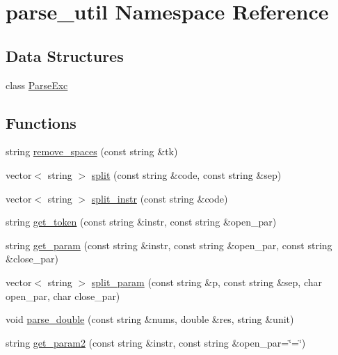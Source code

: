 \hypertarget{namespaceparse__util}{}\section{parse\+\_\+util Namespace Reference}
\label{namespaceparse__util}
\subsection*{Data Structures}
\begin{DoxyCompactItemize}
\item 
class \hyperlink{classparse__util_1_1ParseExc}{Parse\+Exc}
\end{DoxyCompactItemize}
\subsection*{Functions}
\begin{DoxyCompactItemize}
\item 
string \hyperlink{namespaceparse__util_adda823e5ea0e371029fd8d7d9aaaf4d9}{remove\+\_\+spaces} (const string \&tk)
\item 
vector$<$ string $>$ \hyperlink{namespaceparse__util_abed338a93fcf282d1ac304cd901aba6f}{split} (const string \&code, const string \&sep)
\item 
vector$<$ string $>$ \hyperlink{namespaceparse__util_a14526fd1fe35767507f2c20ac147ade3}{split\+\_\+instr} (const string \&code)
\item 
string \hyperlink{namespaceparse__util_a6ad8105b273c8cf887c3f3af52a18913}{get\+\_\+token} (const string \&instr, const string \&open\+\_\+par)
\item 
string \hyperlink{namespaceparse__util_ad1d53324b50452d7a1e53fa9b9f37834}{get\+\_\+param} (const string \&instr, const string \&open\+\_\+par, const string \&close\+\_\+par)
\item 
vector$<$ string $>$ \hyperlink{namespaceparse__util_a5f92a28671f0d399f0dc639c5b72e709}{split\+\_\+param} (const string \&p, const string \&sep, char open\+\_\+par, char close\+\_\+par)
\item 
void \hyperlink{namespaceparse__util_a498f01b8de3af4281754eb7bb9246fba}{parse\+\_\+double} (const string \&nums, double \&res, string \&unit)
\item 
string \hyperlink{namespaceparse__util_a6e8465e95ed595c91ae8f699bef4cbc1}{get\+\_\+param2} (const string \&instr, const string \&open\+\_\+par=\char`\"{}=\char`\"{})
\end{DoxyCompactItemize}



